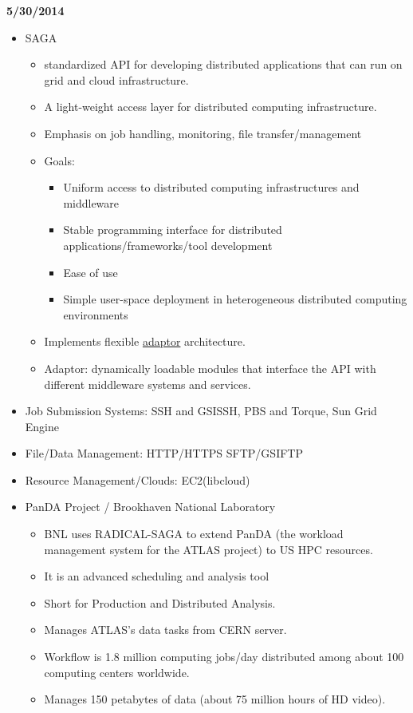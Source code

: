 \documentclass[letterpaper,english,12pt]{article}
\begin{document}
\textbf{5/30/2014}
\begin{itemize}
	\item SAGA
		\begin{itemize}
			\item standardized API for developing distributed applications that can run on grid and cloud infrastructure.
			\item A light-weight access layer for distributed computing infrastructure.
			\item Emphasis on job handling, monitoring, file transfer/management
			\item Goals:
				\begin{itemize}
					\item Uniform access to distributed computing infrastructures and middleware
					\item Stable programming interface for distributed applications/frameworks/tool development
					\item Ease of use
					\item Simple user-space deployment in heterogeneous distributed computing environments
				\end{itemize}
			\item Implements flexible \underline{adaptor} architecture.
			\item Adaptor: dynamically loadable modules that interface the API with different middleware systems and services.
		\end{itemize}
	\item Job Submission Systems: SSH and GSISSH, PBS and Torque, Sun Grid Engine
	\item File/Data Management: HTTP/HTTPS SFTP/GSIFTP
	\item Resource Management/Clouds: EC2(libcloud)
	\item PanDA Project / Brookhaven National Laboratory
		\begin{itemize}
			\item BNL uses RADICAL-SAGA to extend PanDA (the workload management system for the ATLAS project) to US HPC resources.
			\item It is an advanced scheduling and analysis tool
			\item Short for Production and Distributed Analysis.
			\item Manages ATLAS's data tasks from CERN server.
			\item Workflow is 1.8 million computing jobs/day distributed among about 100 computing centers worldwide.
			\item Manages 150 petabytes of data (about 75 million hours of HD video).

\end{itemize}
\end{itemize}
\end{document}
